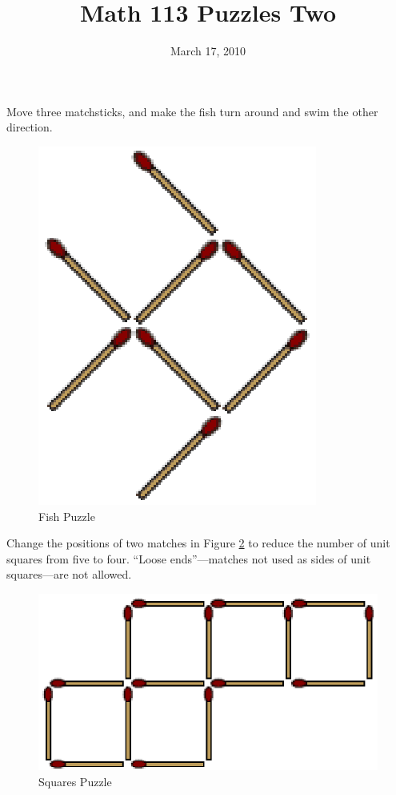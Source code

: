 \documentclass[fleqn,addpoints]{exam}
\title{Math 113 Puzzles Two}
\author{}
\date{March 17, 2010}
\begin{document}
\maketitle

\begin{questions}

\question

Move three matchsticks, and make the fish turn around and swim the other direction.

\begin{figure}[h]
  \label{fig:fish}
  \centering
  \includegraphics*{fish-puzzle.eps}  
  \caption{Fish Puzzle}
\end{figure}

\question
Change the positions of two matches in Figure \ref{fig:match} to reduce the number of unit squares from five to four.
``Loose ends''---matches not used as sides of unit squares---are not allowed.

\begin{figure}[h]
  \label{fig:match}
  \centering
  \includegraphics*{match-puzzle.eps}  
  \caption{Squares Puzzle}
\end{figure}


\end{questions}
\end{document}
